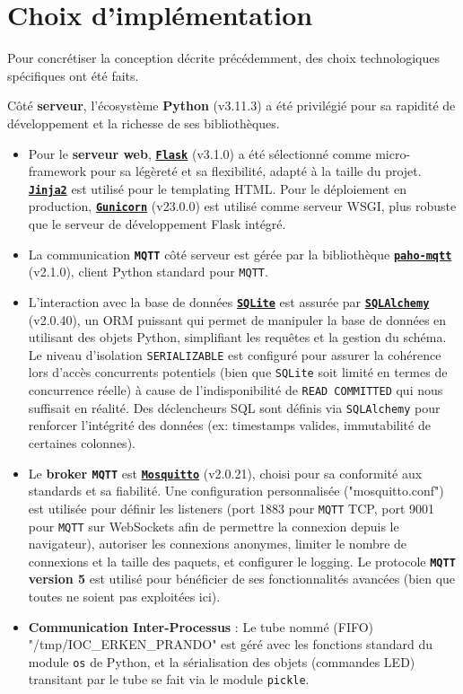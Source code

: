 \documentclass[12pt]{article}
\begin{document}
\section{Choix d'implémentation}

Pour concrétiser la conception décrite précédemment, des choix technologiques spécifiques ont été faits.

Côté \textbf{serveur}, l'écosystème \textbf{Python} (v3.11.3) a été privilégié pour sa rapidité de développement et la richesse de ses bibliothèques.
\begin{itemize}
    \item Pour le \textbf{serveur web}, \textbf{\href{https://flask.palletsprojects.com/}{\texttt{Flask}}} (v3.1.0) a été sélectionné comme micro-framework pour sa légèreté et sa flexibilité, adapté à la taille du projet. \textbf{\href{https://jinja.palletsprojects.com/}{\texttt{Jinja2}}} est utilisé pour le templating HTML. Pour le déploiement en production, \textbf{\href{https://gunicorn.org/}{\texttt{Gunicorn}}} (v23.0.0) est utilisé comme serveur WSGI, plus robuste que le serveur de développement Flask intégré.
    \item La communication \textbf{\texttt{MQTT}} côté serveur est gérée par la bibliothèque \textbf{\href{https://github.com/eclipse/paho.mqtt.python}{\texttt{paho-mqtt}}} (v2.1.0), client Python standard pour \texttt{MQTT}.
    \item L'interaction avec la base de données \textbf{\href{https://www.sqlite.org/index.html}{\texttt{SQLite}}} est assurée par \textbf{\href{https://www.sqlalchemy.org/}{\texttt{SQLAlchemy}}} (v2.0.40), un ORM puissant qui permet de manipuler la base de données en utilisant des objets Python, simplifiant les requêtes et la gestion du schéma. Le niveau d'isolation \texttt{SERIALIZABLE} est configuré pour assurer la cohérence lors d'accès concurrents potentiels (bien que \texttt{SQLite} soit limité en termes de concurrence réelle) à cause de l'indisponibilité de \texttt{READ COMMITTED} qui nous suffisait en réalité. Des déclencheurs SQL sont définis via \texttt{SQLAlchemy} pour renforcer l'intégrité des données (ex: timestamps valides, immutabilité de certaines colonnes).
    \item Le \textbf{broker \texttt{MQTT}} est \textbf{\href{https://mosquitto.org/}{\texttt{Mosquitto}}} (v2.0.21), choisi pour sa conformité aux standards et sa fiabilité. Une configuration personnalisée ("mosquitto.conf") est utilisée pour définir les listeners (port 1883 pour \texttt{MQTT} TCP, port 9001 pour \texttt{MQTT} sur WebSockets afin de permettre la connexion depuis le navigateur), autoriser les connexions anonymes, limiter le nombre de connexions et la taille des paquets, et configurer le logging. Le protocole \textbf{\texttt{MQTT} version 5} est utilisé pour bénéficier de ses fonctionnalités avancées (bien que toutes ne soient pas exploitées ici).
    \item \textbf{Communication Inter-Processus} : Le tube nommé (FIFO) "/tmp/IOC\_ERKEN\_PRANDO" est géré avec les fonctions standard du module \texttt{os} de Python, et la sérialisation des objets (commandes LED) transitant par le tube se fait via le module \texttt{pickle}.
\end{itemize} \hfill \break
\end{document}
